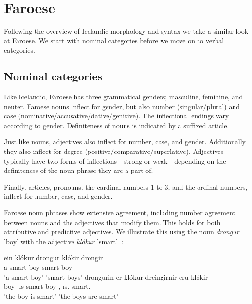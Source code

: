 \documentclass[12pt,%
    times,
]{lin-v2/lin}
\begin{document}
\section{Faroese}

Following the overview of Icelandic morphology and syntax we take a similar look at Faroese.
We start with nominal categories before we move on to verbal categories.

\subsection{Nominal categories}

Like Icelandic, Faroese has three grammatical genders; masculine, feminine, and neuter.
Faroese nouns inflect for gender, but also number (singular/plural) and case (nominative/accusative/dative/genitive).
The inflectional endings vary according to gender. Definiteness of nouns is indicated by a suffixed article.

Just like nouns, adjectives also inflect for number, case, and gender. Additionally they also inflect for degree
(positive/comparative/superlative). Adjectives typically have two forms of inflections - strong or weak - depending
on the definiteness of the noun phrase they are a part of.

Finally, articles, pronouns, the cardinal numbers 1 to 3, and the ordinal numbers, inflect for number, case, and gender.

Faroese noun phrases show extensive agreement, including number agreement between nouns and the adjectives that modify them.
This holds for both attributive and predictive adjectives. We illustrate this using the noun \emph{drongur} 'boy'
with the adjective \emph{klókur} 'smart'~\citep[61]{faroese}:
\begin{exe}
    \ex
    \gll ein klókur drongur klókir drongir\\
    a smart boy smart boy\\
    \trans 'a smart boy' 'smart boys'
    \gll drongurin er klókur dreingirnir eru klókir\\
    boy-\Det{} is smart boy-\Det,\Pl{} is.\Pl{} smart.\Pl\\
    \trans 'the boy is smart' 'the boys are smart'
\end{exe}
\end{document}
